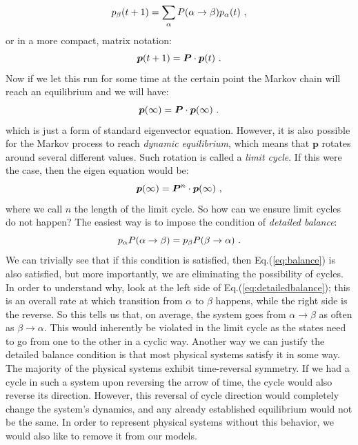 \begin{equation*}
	p_{\beta}(t+1) = \sum_{\alpha} P(\alpha \rightarrow \beta) p_{\alpha}(t) \ ,
\end{equation*}
or in a more compact, matrix notation:
\begin{equation*}
	\bm{p}(t+1) = \bm{P} \cdot \bm{p}(t) \ .
\end{equation*}
Now if we let this run for some time at the certain point the Markov chain will reach an equilibrium and we will have:
\begin{equation*}
	\bm{p}(\infty) = \bm{P} \cdot \bm{p}(\infty) \ .
\end{equation*}
which is just a form of standard eigenvector equation. However, it is also possible for the Markov process to reach \textit{dynamic equilibrium}, which means that $\bm{p}$ rotates around several different values. Such rotation is called a \textit{limit cycle}. If this were the case, then the eigen equation would be:
\begin{equation*}
	\bm{p}(\infty) = \bm{P}^n \cdot \bm{p}(\infty) \ ,
\end{equation*}
where we call $n$ the length of the limit cycle. So how can we ensure limit cycles do not happen? The easiest way is to impose the condition of \textit{detailed balance}:
\begin{equation}
	p_{\alpha} P(\alpha \rightarrow \beta) = p_{\beta}P(\beta \rightarrow \alpha) \ .
	\label{eq:detailedbalance}
\end{equation}
We can trivially see that if this condition is satisfied, then Eq.(\ref{eq:balance}) is also satisfied, but more importantly, we are eliminating the possibility of cycles. In order to understand why, look at the left side of Eq.(\ref{eq:detailedbalance}); this is an overall rate at which transition from $\alpha$ to $\beta$ happens, while the right side is the reverse. So this tells us that, on average, the system goes from $\alpha \rightarrow \beta$ as often as $\beta \rightarrow \alpha$. This would inherently be violated in the limit cycle as the states need to go from one to the other in a cyclic way. Another way we can justify the detailed balance condition is that most physical systems satisfy it in some way. The majority of the physical systems exhibit time-reversal symmetry. If we had a cycle in such a system upon reversing the arrow of time, the cycle would also reverse its direction. However, this reversal of cycle direction would completely change the system's dynamics, and any already established equilibrium would not be the same. In order to represent physical systems without this behavior, we would also like to remove it from our models.  
